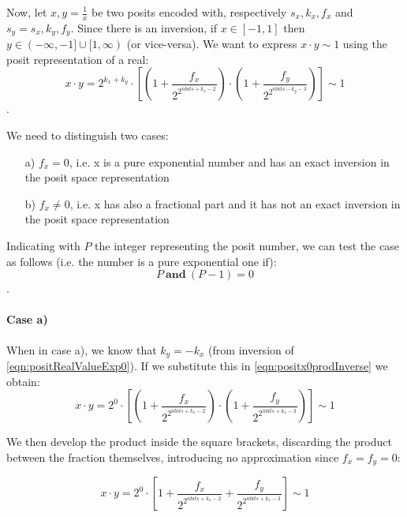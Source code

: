 Now, let $x, y = \frac{1}{x}$ be two posits encoded with, respectively $s_x,k_x, f_x$ and $s_y = s_x, k_y, f_y$. Since there is an inversion, if $x \in [-1,1]$ then $y \in (-\infty, -1] \cup [1,\infty)$ (or vice-versa). We want to express $x \cdot y \sim 1$ using the posit representation of a real:
\begin{equation}\label{eqn:positx0prodInverse}
    x \cdot y = 2^{k_x+k_y} \cdot \left[ \left (1 + \frac{f_x}{2^{2^{nbits + k_x - 2}}} \right ) \cdot \left (1 + \frac{f_y}{2^{2^{nbits - k_y - 3}}} \right ) \right] \sim 1
\end{equation}.

We need to distinguish two cases:
\begin{itemize}
    \item[a)]$f_x = 0$, i.e. x is a pure exponential number and has an exact inversion in the posit space representation
    \item[b)] $f_x \neq 0$, i.e. x has also a fractional part and it has not an exact inversion in the posit space representation
\end{itemize}

Indicating with $P$ the integer representing the posit number, we can test the case as follows (i.e. the number is a pure exponential one if): 
\begin{equation}
    P\ \mathbf{and}\ (P - 1) = 0
\end{equation}.

\paragraph{Case a)} When in case a), we know that $k_y = -k_x$ (from inversion of \eqref{eqn:positRealValueExp0}). If we substitute this in \eqref{eqn:positx0prodInverse} we obtain:
\begin{equation}
    x \cdot y = 2^{0} \cdot \left[ \left (1 + \frac{f_x}{2^{2^{nbits + k_x - 2}}} \right ) \cdot \left (1 + \frac{f_y}{2^{2^{nbits + k_x - 3}}} \right ) \right] \sim 1
\end{equation}

We then develop the product inside the square brackets, discarding the product between the fraction themselves, introducing no approximation since $f_x = f_y = 0$:

\begin{equation}
    x \cdot y = 2^{0} \cdot \left[ 1 + \frac{f_x}{2^{2^{nbits + k_x - 2}}}  + \frac{f_y}{2^{2^{nbits + k_x - 3}}} \right] \sim 1
\end{equation}

